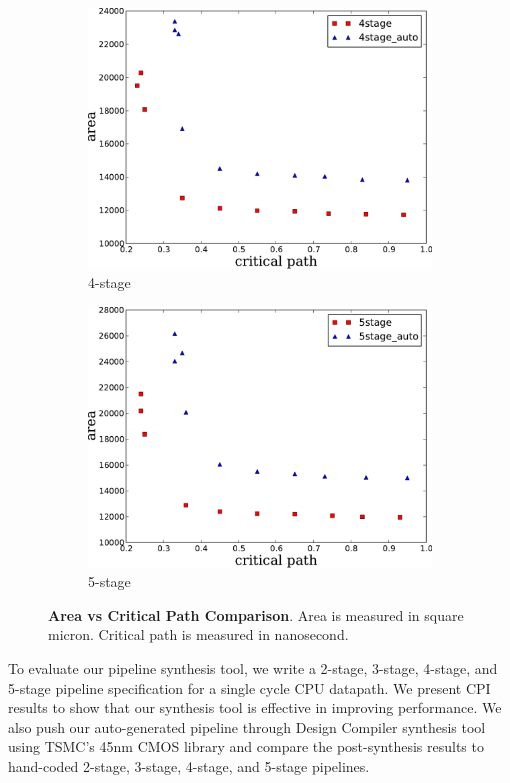 \begin{figure}[htb]
\begin{subfigure}[t]{0.47\textwidth}
  \label{fig:3stage}
  \vspace{20pt}
  \end{subfigure}
  \hfill
  \begin{subfigure}[t]{0.47\textwidth}
  \centering
  \includegraphics[width=\textwidth]{figures/4stage.pdf}
  \caption{4-stage}
  \label{fig:4stage}
  \end{subfigure}
  \hfill
  \begin{subfigure}[t]{0.47\textwidth}
  \centering
  \includegraphics[width=\textwidth]{figures/5stage.pdf}
  \caption{5-stage}
  \label{fig:5stage}
  \end{subfigure}
\caption{{\bf Area vs Critical Path Comparison}. Area is measured in
  square micron. Critical path is measured in nanosecond.}
\label{fig:area-time}
\end{figure}
To evaluate our pipeline synthesis tool, we write a 2-stage, 3-stage,
4-stage, and 5-stage pipeline specification for a single cycle CPU
datapath. We present CPI results to show that our synthesis tool is
effective in improving performance. We also push our auto-generated
pipeline through Design Compiler synthesis tool using TSMC's 45nm CMOS
library and compare the post-synthesis results to hand-coded 2-stage,
3-stage, 4-stage, and 5-stage pipelines.

